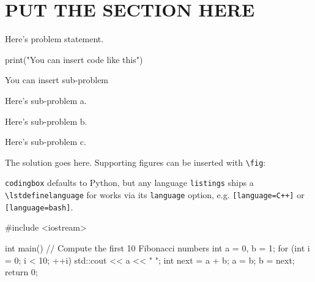 \documentclass[a4paper, 10pt]{article}
\begin{document}
\subject
{}

\section{PUT THE SECTION HERE}

\begin{problem}
Here's problem statement.
\begin{codingbox}
    print("You can insert code like this")
\end{codingbox}
You can insert sub-problem
\begin{subproblems}
	\item Here's sub-problem a.
	\item Here's sub-problem b.
	\item Here's sub-problem c.
\end{subproblems}
\end{problem}

\begin{solution}
	The solution goes here. Supporting figures can be inserted with \verb|\fig|:
\end{solution}

\begin{problem}
\verb|codingbox| defaults to Python, but any language \texttt{listings} ships a
\verb|\lstdefinelanguage| for works via its \texttt{language} option, e.g.
\verb|[language=C++]| or \verb|[language=bash]|.
\begin{codingbox}[language=C++]
#include <iostream>

int main() {
    // Compute the first 10 Fibonacci numbers
    int a = 0, b = 1;
    for (int i = 0; i < 10; ++i) {
        std::cout << a << " ";
        int next = a + b;
        a = b;
        b = next;
    }
    return 0;
}
\end{codingbox}
\end{problem}
\end{document}
